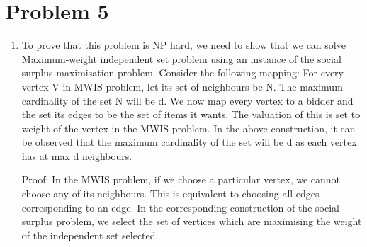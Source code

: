 \documentclass{article}
\begin{document}
\section*{Problem 5}
\begin{enumerate}
\item %
	To prove that this problem is NP hard, we need to show that we can solve Maximum-weight independent set problem using an instance of the social surplus maximisation problem.
	\newline
	Consider the following mapping: \newline
	For every vertex V in MWIS problem, let its set of neighbours be N. The maximum cardinality of the set N will be d. \newline
	We now map every vertex to a bidder and the set its edges to be the set of items it wants. The valuation of this is set to weight of the vertex in the MWIS problem. \newline
	In the above construction, it can be observed that the maximum cardinality of the set will be d as each vertex has at max d neighbours. \newline
	
	Proof: \newline
	In the MWIS problem, if we choose a particular vertex, we cannot choose any of its neighbours. This is equivalent to choosing all edges corresponding to an edge. 
	In the corresponding construction of the social surplus problem, we select the set of vertices which are maximising the weight of the independent set selected.
	\newline


\end{enumerate}
\end{document}
